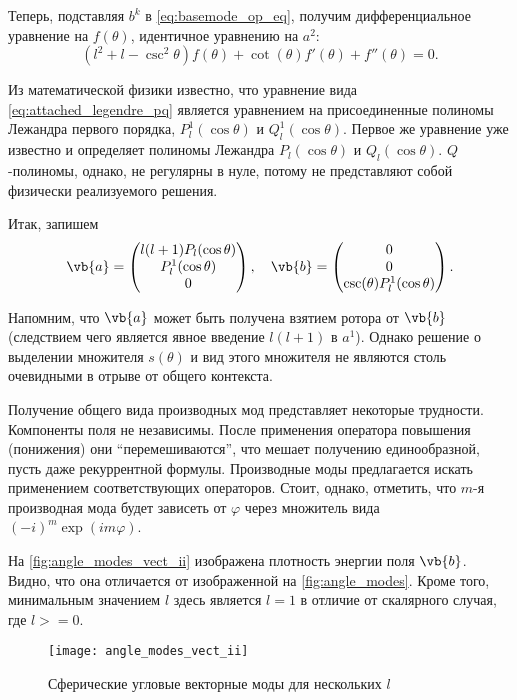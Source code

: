    Теперь, подставляя $b^k$ в \autoref{eq:basemode_op_eq}, получим дифференциальное уравнение на $f(\theta)$, идентичное уравнению на $a^2$:
    \begin{equation}\label{eq:attached_legendre_pq}
        (l^2 + l - \csc^2\theta) f(\theta) + \cot(\theta) f'(\theta) + f''(\theta) = 0.
    \end{equation}

    Из математической физики известно, что уравнение вида \autoref{eq:attached_legendre_pq} является уравнением на присоединенные полиномы Лежандра первого порядка, $P_l^1(\cos\theta)$ и $Q_l^1(\cos\theta)$. Первое же уравнение уже известно и определяет полиномы Лежандра $P_l(\cos\theta)$ и $Q_l(\cos\theta)$. $Q$-полиномы, однако, не регулярны в нуле, потому не представляют собой физически реализуемого решения.

    Итак, запишем
    \begin{equation}
        \vb{a} = \begin{pmatrix}
            l (l + 1) P_l(\cos\theta) \\
            P_l^1(\cos\theta) \\
            0
        \end{pmatrix} , \quad
        \vb{b} = \begin{pmatrix}
            0 \\
            0 \\
            \csc(\theta) P_l^1(\cos\theta)
        \end{pmatrix} .
    \end{equation}

    Напомним, что $\vb{a}$ может быть получена взятием ротора от $\vb{b}$ (следствием чего является явное введение $l(l+1)$ в $a^1$). Однако решение о выделении множителя $s(\theta)$ и вид этого множителя не являются столь очевидными в отрыве от общего контекста.

    Получение общего вида производных мод представляет некоторые трудности. Компоненты поля не независимы. После применения оператора повышения (понижения) они \enquote{перемешиваются}, что мешает получению единообразной, пусть даже рекуррентной формулы. Производные моды предлагается искать применением соответствующих операторов. Стоит, однако, отметить, что $m$-я производная мода будет зависеть от $\varphi$ через множитель вида $(-i)^m \exp(i m \varphi)$.

    На \autoref{fig:angle_modes_vect_ii} изображена плотность энергии поля $\vb{b}$. Видно, что она отличается от изображенной на \autoref{fig:angle_modes}. Кроме того, минимальным значением $l$ здесь является $l = 1$ в отличие от скалярного случая, где $l >= 0$.
    \begin{figure}[h]
        \centering
        \texttt{[image: angle\_modes\_vect\_ii]}
        \caption[]{Сферические угловые векторные моды для нескольких $l$}
        \label{fig:angle_modes_vect_ii}
    \end{figure}

